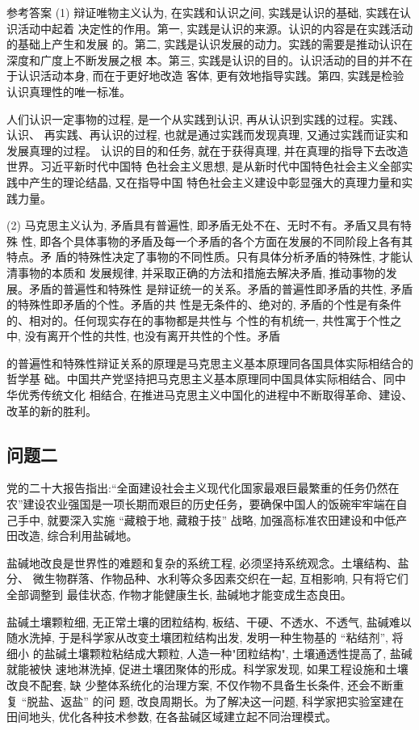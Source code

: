 \documentclass[a4paper,12pt]{article}
\begin{document}
\begin{mainbox}{参考答案}
(1) 辩证唯物主义认为, 在实践和认识之间, 实践是认识的基础, 实践在认识活动中起着 决定性的作用。第一, 实践是认识的来源。认识的内容是在实践活动的基础上产生和发展 的。第二, 实践是认识发展的动力。实践的需要是推动认识在深度和广度上不断发展之根 本。第三, 实践是认识的目的。认识活动的目的并不在于认识活动本身, 而在于更好地改造 客体, 更有效地指导实践。第四, 实践是检验认识真理性的唯一标准。

人们认识一定事物的过程, 是一个从实践到认识, 再从认识到实践的过程。实践、认识、 再实践、再认识的过程, 也就是通过实践而发现真理, 又通过实践而证实和发展真理的过程。 认识的目的和任务, 就在于获得真理, 并在真理的指导下去改造世界。习近平新时代中国特 色社会主义思想, 是从新时代中国特色社会主义全部实践中产生的理论结晶, 又在指导中国 特色社会主义建设中彰显强大的真理力量和实践力量。

(2) 马克思主义认为, 矛盾具有普遍性, 即矛盾无处不在、无时不有。矛盾又具有特殊 性, 即各个具体事物的矛盾及每一个矛盾的各个方面在发展的不同阶段上各有其特点。矛 盾的特殊性决定了事物的不同性质。只有具体分析矛盾的特殊性, 才能认清事物的本质和 发展规律, 并采取正确的方法和措施去解决矛盾, 推动事物的发展。矛盾的普遍性和特殊性 是辩证统一的关系。矛盾的普遍性即矛盾的共性, 矛盾的特殊性即矛盾的个性。矛盾的共 性是无条件的、绝对的, 矛盾的个性是有条件的、相对的。任何现实存在的事物都是共性与 个性的有机统一, 共性寓于个性之中, 没有离开个性的共性, 也没有离开共性的个性。矛盾

的普遍性和特殊性辩证关系的原理是马克思主义基本原理同各国具体实际相结合的哲学基 础。中国共产党坚持把马克思主义基本原理同中国具体实际相结合、同中华优秀传统文化 相结合, 在推进马克思主义中国化的进程中不断取得革命、建设、改革的新的胜利。
\end{mainbox}

\subsection{问题二}
党的二十大报告指出:“全面建设社会主义现代化国家最艰巨最繁重的任务仍然在农”建设农业强国是一项长期而艰巨的历史任务，要确保中国人的饭碗牢牢端在自己手中, 就要深入实施 “藏粮于地, 藏粮于技” 战略, 加强高标准农田建设和中低产田改造,  综合利用盐碱地。

盐碱地改良是世界性的难题和复杂的系统工程, 必须坚持系统观念。土壤结构、盐分、 微生物群落、作物品种、水利等众多因素交织在一起, 互相影响, 只有将它们全部调整到 最佳状态, 作物才能健康生长, 盐碱地才能变成生态良田。

盐碱土壤颗粒细, 无正常土壤的团粒结构, 板结、干硬、不透水、不透气, 盐碱难以 随水洗掉, 于是科学家从改变土壤团粒结构出发, 发明一种生物基的 “粘结剂”, 将细小 的盐碱土壤颗粒粘结成大颗粒, 人造一种"团粒结构", 土壤通透性提高了, 盐碱就能被快 速地淋洗掉, 促进土壤团聚体的形成。科学家发现, 如果工程设施和土壤改良不配套, 缺 少整体系统化的治理方案, 不仅作物不具备生长条件, 还会不断重复 “脱盐、返盐” 的问 题, 改良周期长。为了解决这一问题, 科学家把实验室建在田间地头, 优化各种技术参数,  在各盐碱区域建立起不同治理模式。
\end{document}
